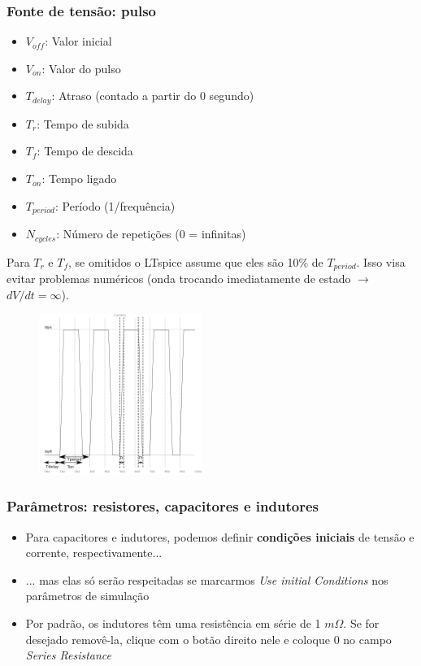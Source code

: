 \documentclass{beamer}
\begin{document}
\begin{frame}
\frametitle{Fonte de tensão: pulso}
\begin{itemize}
\item {$V_{off}$}: Valor inicial
\item {$V_{on}$}: Valor do pulso
\item {$T_{delay}$}: Atraso (contado a partir do 0 segundo)
\item {$T_{r}$}: Tempo de subida 
\item {$T_{f}$}: Tempo de descida
\item {$T_{on}$}: Tempo ligado
\item {$T_{period}$}: Período (1/frequência)
\item {$N_{cycles}$}: Número de repetições (0 = infinitas)
\end{itemize}
Para $T_r$ e $T_f$, se omitidos o LTspice assume que eles são 10\% de $T_{period}$.
Isso visa evitar problemas numéricos (onda trocando imediatamente de estado $\rightarrow$ $dV/dt = \infty$).
\end{frame}
\begin{figure}[htb]
\includegraphics[width=200px]{images/square_wave}
\end{figure}
\begin{frame}

\end{frame}
\begin{frame}
\frametitle{Parâmetros: resistores, capacitores e indutores}
\begin{itemize}
\item{Para capacitores e indutores, podemos definir \textbf{condições iniciais} de tensão e corrente, respectivamente...}
\item{... mas elas só serão respeitadas se marcarmos \textit{Use initial Conditions} nos parâmetros de simulação}
\item{Por padrão, os indutores têm uma resistência em série de 1 $m\Omega$. Se for desejado removê-la, clique com o botão direito nele e coloque 0 no campo \textit{Series Resistance}}
\end{itemize}
\end{frame}
\end{document}
